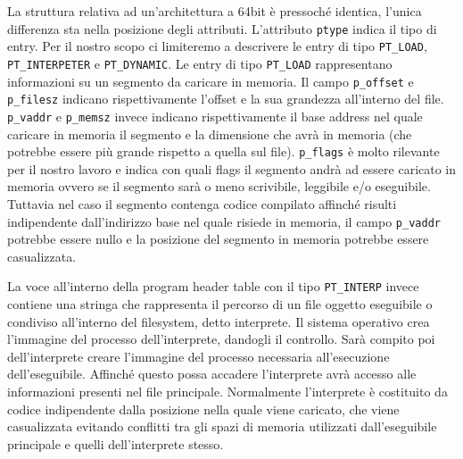 La struttura relativa ad un'architettura a 64bit è pressoché identica,
l'unica differenza sta nella posizione degli attributi.  L'attributo
\lstinline{ptype} indica il tipo di entry. Per il nostro scopo ci
limiteremo a descrivere le entry di tipo \lstinline{PT_LOAD},
\lstinline{PT_INTERPETER} e \lstinline{PT_DYNAMIC}. Le entry di tipo
\lstinline{PT_LOAD} rappresentano informazioni su un segmento da
caricare in memoria. Il campo \lstinline{p_offset} e
\lstinline{p_filesz} indicano rispettivamente l'offset e la sua
grandezza all'interno del file. \lstinline{p_vaddr} e
\lstinline{p_memsz} invece indicano rispettivamente il base address
nel quale caricare in memoria il segmento e la dimensione che avrà in
memoria (che potrebbe essere più grande rispetto a quella sul
file). \lstinline{p_flags} è molto rilevante per il nostro lavoro e
indica con quali flags il segmento andrà ad essere caricato in memoria
ovvero se il segmento sarà o meno scrivibile, leggibile e/o
eseguibile. Tuttavia nel caso il segmento contenga codice compilato
affinché risulti indipendente dall'indirizzo base nel quale risiede in
memoria, il campo \lstinline{p_vaddr} potrebbe essere nullo e la
posizione del segmento in memoria potrebbe essere casualizzata.

La voce all'interno della program header table con il tipo
\lstinline{PT_INTERP} invece contiene una stringa che rappresenta il
percorso di un file oggetto eseguibile o condiviso all'interno del
filesystem, detto interprete. Il sistema operativo crea l'immagine del
processo dell'interprete, dandogli il controllo. Sarà compito poi
dell'interprete creare l'immagine del processo necessaria
all'esecuzione dell'eseguibile. Affinché questo possa accadere
l'interprete avrà accesso alle informazioni presenti nel file
principale. Normalmente l'interprete è costituito da codice
indipendente dalla posizione nella quale viene caricato, che viene
casualizzata evitando conflitti tra gli spazi di memoria utilizzati
dall'eseguibile principale e quelli dell'interprete stesso.

